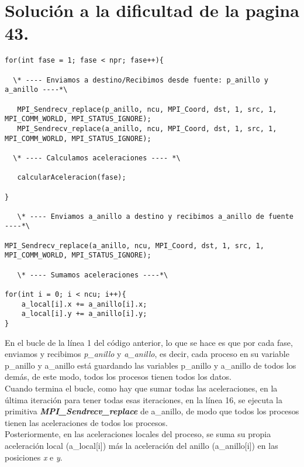 \documentclass[11pt]{article}
\begin{document}
\section{Solución a la dificultad de la pagina 43.}
\begin{lstlisting}[style=C]
for(int fase = 1; fase < npr; fase++){

  \* ---- Enviamos a destino/Recibimos desde fuente: p_anillo y a_anillo ----*\

   MPI_Sendrecv_replace(p_anillo, ncu, MPI_Coord, dst, 1, src, 1, MPI_COMM_WORLD, MPI_STATUS_IGNORE);
   MPI_Sendrecv_replace(a_anillo, ncu, MPI_Coord, dst, 1, src, 1, MPI_COMM_WORLD, MPI_STATUS_IGNORE);

  \* ---- Calculamos aceleraciones ---- *\

   calcularAceleracion(fase);

}
	
   \* ---- Enviamos a_anillo a destino y recibimos a_anillo de fuente ----*\

MPI_Sendrecv_replace(a_anillo, ncu, MPI_Coord, dst, 1, src, 1, MPI_COMM_WORLD, MPI_STATUS_IGNORE);

   \* ---- Sumamos aceleraciones ----*\

for(int i = 0; i < ncu; i++){
	a_local[i].x += a_anillo[i].x;
	a_local[i].y += a_anillo[i].y;
}
\end{lstlisting}
En el bucle de la línea 1 del código anterior, lo que se hace es que por cada fase, enviamos y recibimos \textit{p\_anillo} y \textit{a\_anillo}, es decir, cada proceso en su variable p\_anillo y a\_anillo está guardando las variables p\_anillo y a\_anillo de todos los demás, de este modo, todos los procesos tienen todos los datos. \\

Cuando termina el bucle, como hay que sumar todas las aceleraciones, en la última iteración para tener todas esas iteraciones, en la línea 16, se ejecuta la primitiva \textbf{\textit{MPI\_Sendrecv\_replace}} de a\_anillo, de modo que todos los procesos tienen las aceleraciones de todos los procesos. \\

Posteriormente, en las aceleraciones locales del proceso, se suma su propia aceleración local (a\_local[i]) más la aceleración del anillo (a\_anillo[i]) en las posiciones \textit{x} e \textit{y}.
\end{document}
